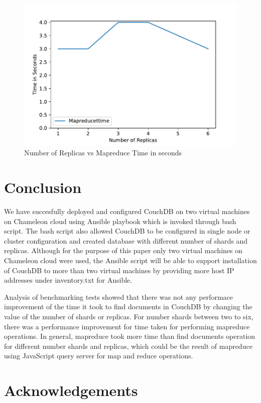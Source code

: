 \begin{figure}[!ht]
  \centering\includegraphics[width=\columnwidth]{../images/ReplicasMapReduce.pdf}
  \caption{Number of Replicas vs Mapreduce Time in seconds }\label{f:replica-mapreduce}
\end{figure}

\section{Conclusion}

We have succesfully deployed and configured CouchDB on two virtual
machines on Chameleon cloud using Ansible playbook which is invoked
through bash script. The bash script also allowed CouchDB to be
configured in single node or cluster configuration and created
database with different number of shards and replicas. Although for
the purpose of this paper only two virtual machines on Chameleon cloud
were used, the Ansible script will be able to support installation of
CouchDB to more than two virtual machines by providing more host IP
addresses under inventory.txt for Ansible.

Analysis of benchmarking tests showed that there was not any
performace improvement of the time it took to find documents in
CouchDB by changing the value of the number of shards or replicas. For
number shards between two to six, there was a performance improvement
for time taken for performing mapreduce operations. In general,
mapreduce took more time than find documents operation for different
number shards and replicas, which could be the result of mapreduce
using JavaScript query server for map and reduce operations.


\section*{Acknowledgements}

